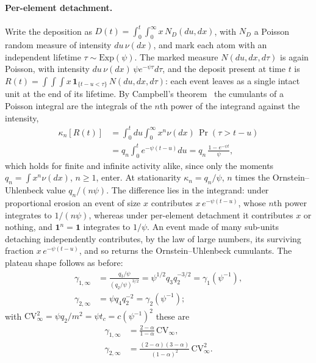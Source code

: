 \documentclass[preprint,12pt]{elsarticle}
\begin{document}
\paragraph*{Per-element detachment.}
Write the deposition as $D(t)=\int_0^t\!\int_0^\infty x\,N_D(du,dx)$, with
$N_D$ a Poisson random measure of intensity $du\,\nu(dx)$, and mark each atom
with an independent lifetime $\tau\sim\mathrm{Exp}(\psi)$. The marked measure
$N(du,dx,d\tau)$ is again Poisson, with intensity
$du\,\nu(dx)\,\psi e^{-\psi\tau}d\tau$, and the deposit present at time $t$ is
$R(t)=\int\!\int\!\int x\,\mathbf 1_{\{t-u<\tau\}}\,N(du,dx,d\tau)$: each
event leaves as a single intact unit at the end of its lifetime. By Campbell's
theorem~\cite{Campbell1909} the cumulants of a Poisson integral are the integrals of the $n$th
power of the integrand against the intensity,
\begin{equation*}
\begin{aligned}
  \kappa_n[R(t)]&=\int_0^t\!du\int_0^\infty\!x^n\nu(dx)\,\Pr(\tau>t-u)\\
  &=q_n\int_0^te^{-\psi(t-u)}du=q_n\,\frac{1-e^{-\psi t}}{\psi},
\end{aligned}
\end{equation*}
which holds for finite and infinite activity alike, since only the moments
$q_n=\int x^n\nu(dx)$, $n\ge1$, enter. At stationarity
$\kappa_n=q_n/\psi$, $n$ times the Ornstein--Uhlenbeck value $q_n/(n\psi)$.
The difference lies in the integrand: under proportional erosion an event of
size $x$ contributes $x\,e^{-\psi(t-u)}$, whose $n$th power integrates to
$1/(n\psi)$, whereas under per-element detachment it contributes $x$ or nothing,
and $\mathbf 1^n=\mathbf 1$ integrates to $1/\psi$. An event made of many
sub-units detaching independently contributes, by the law of large numbers,
its surviving fraction $x\,e^{-\psi(t-u)}$, and so returns the
Ornstein--Uhlenbeck cumulants. The plateau shape follows as before:
\begin{equation}
\begin{aligned}
  \gamma_{1,\infty}&=\frac{q_3/\psi}{(q_2/\psi)^{3/2}}=\psi^{1/2}q_3q_2^{-3/2}=\gamma_1(\psi^{-1}),\\
  \gamma_{2,\infty}&=\psi q_4q_2^{-2}=\gamma_2(\psi^{-1});
\end{aligned}
\end{equation}
with $\mathrm{CV}_\infty^2=\psi q_2/m^2=\psi t_c=c(\psi^{-1})^2$ these are
\begin{equation*}
\begin{aligned}
  \gamma_{1,\infty}&=\frac{2-\alpha}{1-\alpha}\,\mathrm{CV}_\infty,\\
  \gamma_{2,\infty}&=\frac{(2-\alpha)(3-\alpha)}{(1-\alpha)^2}\,\mathrm{CV}_\infty^2.
\end{aligned}
\end{equation*}
\end{document}
